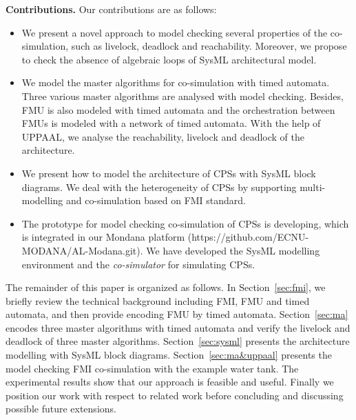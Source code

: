\textbf{Contributions.} Our contributions are as follows:
\begin{itemize}
\item
We present a novel approach to model checking several properties of the co-simulation, such as livelock, deadlock and reachability. Moreover, we propose to check the absence of algebraic loops of SysML architectural model.
\item
We model the master algorithms for co-simulation with timed automata. Three various master algorithms are analysed with model checking. Besides, FMU is also modeled with timed automata and the orchestration between FMUs is modeled with a network of timed automata. With the help of UPPAAL, we analyse the reachability, livelock and deadlock of the architecture.
\item
We present how to model the architecture of CPSs with SysML block diagrams. We deal with the heterogeneity of CPSs by supporting multi-modelling and co-simulation based on FMI standard.
\item
The prototype for model checking co-simulation of CPSs is developing, which is integrated in our Mondana platform \cite{Cheng2015Modana}(https://github.com/ECNU-MODANA/AL-Modana.git). We have developed the SysML modelling environment and the \textit{co-simulator }for simulating CPSs\cite{Fritzson1998Modelica}.
\end{itemize}
The remainder of this paper is organized as follows. In Section~\ref{sec:fmi}, we briefly review the technical background including FMI, FMU and timed automata, and then provide encoding FMU by timed automata.
Section~\ref{sec:ma} encodes three master algorithms with timed automata and verify the livelock and deadlock of three master algorithms.
Section~\ref{sec:sysml} presents the architecture modelling with SysML block diagrams.
Section~\ref{sec:ma&uppaal} presents the model checking FMI co-simulation with the example water tank. The experimental results show that our approach is feasible and useful. 
Finally we position our work with respect to related work before concluding and discussing possible future extensions.




















